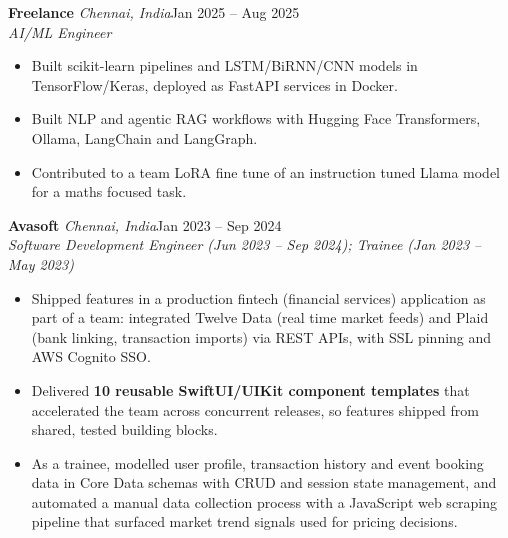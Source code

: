 \documentclass[a4paper,11pt]{article}
\newcommand{\role}[4]{%
  \textbf{#1}{\color{muted}\,\textperiodcentered\,\textit{#2}}\hfill{\color{muted}#3}\\
  \textit{#4}\par}
\newcommand{\gap}{\vspace{5pt}}
\newcommand{\num}[1]{\textbf{#1}}   %
\begin{document}
\gap
{}
\role{Freelance}{Chennai, India}{Jan 2025 – Aug 2025}{AI/ML Engineer}
\begin{itemize}
  \item Built scikit-learn pipelines and LSTM/BiRNN/CNN models in TensorFlow/Keras, deployed as FastAPI services in Docker.
  \item Built NLP and agentic RAG workflows with Hugging Face Transformers, Ollama, LangChain and LangGraph.
  \item Contributed to a team LoRA fine tune of an instruction tuned Llama model for a maths focused task.
\end{itemize}
\gap
{}
\role{Avasoft}{Chennai, India}{Jan 2023 – Sep 2024}{Software Development Engineer (Jun 2023 – Sep 2024); Trainee (Jan 2023 – May 2023)}
\begin{itemize}
  \item Shipped features in a production fintech (financial services) application as part of a team: integrated Twelve Data (real time market feeds) and Plaid (bank linking, transaction imports) via REST APIs, with SSL pinning and AWS Cognito SSO.
  \item Delivered \num{10 reusable SwiftUI/UIKit component templates} that accelerated the team across concurrent releases, so features shipped from shared, tested building blocks.
  \item As a trainee, modelled user profile, transaction history and event booking data in Core Data schemas with CRUD and session state management, and automated a manual data collection process with a JavaScript web scraping pipeline that surfaced market trend signals used for pricing decisions.
\end{itemize}
\end{document}
